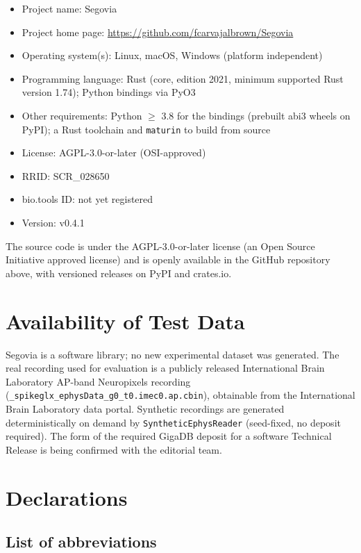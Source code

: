 \documentclass[a4paper,num-refs,gigabyte]{oup-contemporary}
\begin{document}
\begin{itemize}
\item Project name: Segovia
\item Project home page: \url{https://github.com/fcarvajalbrown/Segovia}
\item Operating system(s): Linux, macOS, Windows (platform independent)
\item Programming language: Rust (core, edition 2021, minimum supported Rust version 1.74); Python bindings via PyO3
\item Other requirements: Python $\geq$ 3.8 for the bindings (prebuilt abi3 wheels on PyPI); a Rust toolchain and \texttt{maturin} to build from source
\item License: AGPL-3.0-or-later (OSI-approved)
\item RRID: SCR\_028650
\item bio.tools ID: not yet registered
\item Version: v0.4.1
\end{itemize}

The source code is under the AGPL-3.0-or-later license (an Open Source Initiative approved license) and is openly available in the GitHub repository above, with versioned releases on PyPI and crates.io.

\section{Availability of Test Data}

Segovia is a software library; no new experimental dataset was generated. The real recording used for evaluation is a publicly released International Brain Laboratory AP-band Neuropixels recording (\texttt{\_spikeglx\_ephysData\_g0\_t0.imec0.ap.cbin}), obtainable from the International Brain Laboratory data portal. Synthetic recordings are generated deterministically on demand by \texttt{SyntheticEphysReader} (seed-fixed, no deposit required). The form of the required GigaDB deposit for a software Technical Release is being confirmed with the editorial team.

\section{Declarations}

\subsection{List of abbreviations}
\end{document}
